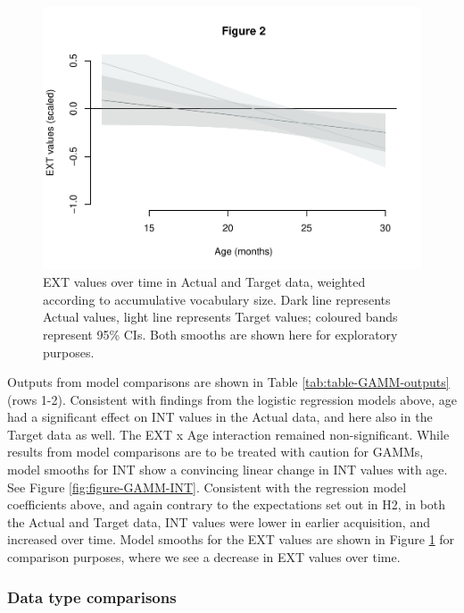 \documentclass[
  man]{apa6}
\begin{document}
\begin{figure}
\centering
\includegraphics{PhonNetworksProj-revised_files/figure-latex/figure-GAMM-EXT-1.pdf}
\caption{\label{fig:figure-GAMM-EXT}EXT values over time in Actual and Target data, weighted according to accumulative vocabulary size. Dark line represents Actual values, light line represents Target values; coloured bands represent 95\% CIs. Both smooths are shown here for exploratory purposes.}
\end{figure}

Outputs from model comparisons are shown in Table \ref{tab:table-GAMM-outputs} (rows 1-2). Consistent with findings from the logistic regression models above, age had a significant effect on INT values in the Actual data, and here also in the Target data as well. The EXT x Age interaction remained non-significant. While results from model comparisons are to be treated with caution for GAMMs, model smooths for INT show a convincing linear change in INT values with age. See Figure \ref{fig:figure-GAMM-INT}. Consistent with the regression model coefficients above, and again contrary to the expectations set out in H2, in both the Actual and Target data, INT values were lower in earlier acquisition, and increased over time. Model smooths for the EXT values are shown in Figure \ref{fig:figure-GAMM-EXT} for comparison purposes, where we see a decrease in EXT values over time.

\hypertarget{data-type-comparisons}{%
\subsubsection{Data type comparisons}\label{data-type-comparisons}}
\end{document}
